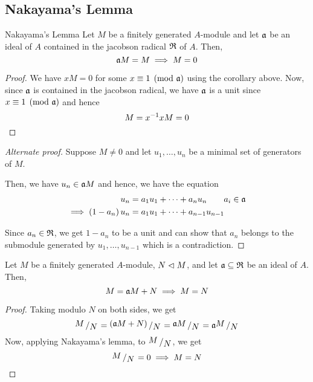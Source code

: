 \subsection{Nakayama's Lemma}

\begin{theorem}{Nakayama's Lemma}{}
	Let \(M\) be a finitely generated \(A\)-module and let \(\mathfrak{a}\) be
	an ideal of \(A\) contained in the jacobson radical \(\mathfrak{R}\) of \(A\).
	Then,
	\[
		\mathfrak{a} M = M \implies M = 0
	\]
\end{theorem}


\begin{proof}
	We have \(xM = 0\) for some \(x \equiv 1 \pmod{\mathfrak{a}}\) using the
	corollary above.
	Now, since \(\mathfrak{a}\) is contained in the jacobson radical, we have
	\(\mathfrak{a}\) is a unit since \(x \equiv 1 \pmod{\mathfrak{a}}\) and hence
	\[
		M = x^{-1} x M = 0 \qedhere
	\]
\end{proof}

\begin{proof}[Alternate proof]
	Suppose \(M \neq 0\) and let \(u_1, \ldots, u_n\) be a minimal set of
	generators of \(M\).

	Then, we have \(u_n \in \mathfrak{a} M\) and hence, we have the equation
	\begin{align*}
		u_n &= a_1 u_1 + \cdots + a_n u_n \quad\quad a_i \in \mathfrak{a} \\
		\implies \left( 1 - a_n \right) u_n &= a_1 u_1 + \cdots + a_{n-1} u_{n-1}
	\end{align*}

	Since \(a_n \in \mathfrak{R}\), we get \(1-a_n\) to be a unit and can show that
	\(a_n\) belongs to the submodule generated by \(u_1, \ldots, u_{n-1}\)
	which is a contradiction.
\end{proof}

\begin{corollary}{}{}
	Let \(M\) be a finitely generated \(A\)-module, \(N \vartriangleleft M\),
	and let \(\mathfrak{a} \subseteq \mathfrak{R}\) be an ideal of \(A\).
	Then,
	\[
		M = \mathfrak{a} M + N \implies M = N
	\]
\end{corollary}

\begin{proof}
	Taking modulo \(N\) on both sides, we get
	\[
		\bigslant{M}{N} = \bigslant{(\mfa M + N)}{N} = \bigslant{\mfa M}{N}
		= \mfa \bigslant{M}{N}
	\]
	Now, applying Nakayama's lemma, to \(\bigslant{M}{N}\), we get
	\[
		\bigslant{M}{N} = 0 \implies M = N \qedhere
	\]
\end{proof}



